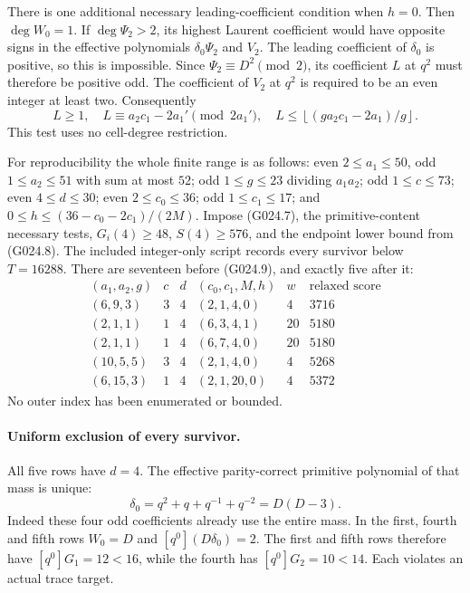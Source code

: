There is one additional necessary leading-coefficient
condition when $h=0$. Then $\deg W_0=1$. If $\deg\Psi_2>2$,
its highest Laurent coefficient would have opposite signs
in the effective polynomials $\delta_0\Psi_2$ and $V_2$.
The leading coefficient of $\delta_0$ is positive, so this
is impossible. Since $\Psi_2\equiv D^2\pmod2$, its
coefficient $L$ at $q^2$ must therefore be positive odd.
The coefficient of $V_2$ at $q^2$ is required to be an
even integer at least two. Consequently
\[
 L\ge1,\quad L\equiv a_2c_1-2a_1'\pmod{2a_1'},\quad
 L\le\left\lfloor(g a_2c_1-2a_1)/g\right\rfloor.
 \tag{G024.9}
\]
This test uses no cell-degree restriction.

For reproducibility the whole finite range is as follows:
even $2\le a_1\le50$, odd $1\le a_2\le51$ with sum
at most $52$; odd $1\le g\le23$ dividing $a_1a_2$;
odd $1\le c\le73$; even $4\le d\le30$;
even $2\le c_0\le36$; odd $1\le c_1\le17$;
and $0\le h\le(36-c_0-2c_1)/(2M)$.
Impose (G024.7), the primitive-content necessary tests,
$G_i(4)\ge48$, $S(4)\ge576$, and the endpoint lower
bound from (G024.8). The included integer-only script
records every survivor below $T=16288$.
There are seventeen before (G024.9), and exactly five
after it:
\[
\begin{array}{c|c|c|c|c|r}
 (a_1,a_2,g)&c&d&(c_0,c_1,M,h)&w&\text{relaxed score}\\\hline
 (6,9,3)&3&4&(2,1,4,0)&4&3716\\
 (2,1,1)&1&4&(6,3,4,1)&20&5180\\
 (2,1,1)&1&4&(6,7,4,0)&20&5180\\
 (10,5,5)&3&4&(2,1,4,0)&4&5268\\
 (6,15,3)&1&4&(2,1,20,0)&4&5372
\end{array}                                                         \tag{G024.10}
\]
No outer index has been enumerated or bounded.

\paragraph{Uniform exclusion of every survivor.}
All five rows have $d=4$. The effective parity-correct
primitive polynomial of that mass is unique:
\[
 \delta_0=q^2+q+q^{-1}+q^{-2}=D(D-3).
\]
Indeed these four odd coefficients already use the entire
mass. In the first, fourth and fifth rows $W_0=D$ and
$[q^0](D\delta_0)=2$. The first and fifth rows therefore
have $[q^0]G_1=12<16$, while the fourth has
$[q^0]G_2=10<14$. Each violates an actual trace target.

